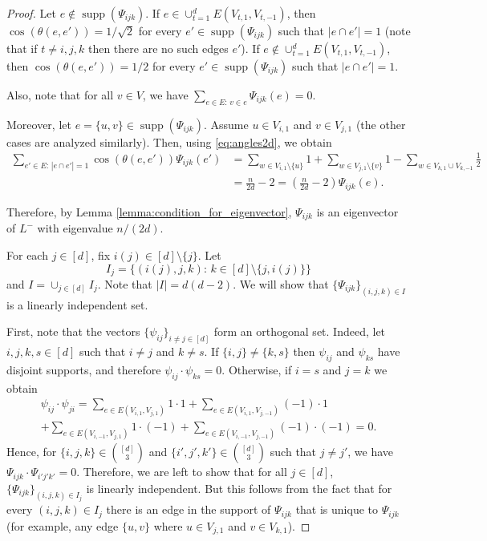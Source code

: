 \documentclass[a4paper,11pt]{article}
\theoremstyle{plain}
\theoremstyle{definition}
\DeclareMathOperator{\supp}{\text{supp}}
\begin{document}
\begin{proof}
Let $e\notin \supp(\Psi_{i j k})$. 
If $e\in \cup_{t=1}^d E(V_{t,1},V_{t,-1})$, then $\cos(\theta(e,e'))=1/\sqrt{2}$
for every $e'\in \supp(\Psi_{i j k})$ such that $|e\cap e'|=1$ (note that if $t\neq i,j,k$ then there are no such edges $e'$).
If $e\notin \cup_{t=1}^d E(V_{t,1},V_{t,-1})$, then $\cos(\theta(e,e'))=1/2$
for every $e'\in \supp(\Psi_{i j k})$ such that $|e\cap e'|=1$.

Also, note that for all $v\in V$, we have $\sum_{e\in E:\, v\in e} \Psi_{i j k}(e)=0$.

Moreover, let $e=\{u,v\}\in\supp(\Psi_{i j k})$. Assume $u\in V_{i, 1}$ and $v\in V_{j, 1}$ (the other cases are analyzed similarly). Then, using \eqref{eq:angles2d}, we obtain
\begin{align*}
        \sum_{e'\in E:\, |e\cap e'|=1} \cos(\theta(e,e'))\Psi_{ i j k}(e') &=\sum_{w\in V_{i,1}\setminus\{u\}} 1 + \sum_{w\in V_{j,1}\setminus\{v\}} 1
        - \sum_{w\in V_{k,1}\cup V_{k,-1}} \frac{1}{2}
      \\
      &= \frac{n}{2d}-2
      = \left(\frac{n}{2d}-2\right)\Psi_{i j k}(e).
\end{align*}


Therefore, by Lemma \ref{lemma:condition_for_eigenvector}, $\Psi_{i j k}$ is an eigenvector of $L^{-}$ with eigenvalue $n/(2d)$. 

For each $j\in [d]$, fix $i(j)\in[d]\setminus\{j\}$. Let
\[
    I_j=\{(i(j),j,k):\, k\in [d]\setminus\{j,i(j)\}\}
\]
and $I=\cup_{j\in[d]} I_j$. Note that $|I|=d(d-2)$. We will show that $\{\Psi_{ijk}\}_{(i,j,k)\in I}$ is a linearly independent set.

First, note that the vectors $\{\psi_{ij}\}_{i\neq j\in[d]}$ form an orthogonal set. Indeed, let $i,j,k,s\in[d]$ such that $i\neq j$ and $k\neq s$. If $\{i,j\}\neq \{k,s\}$ then $\psi_{i j}$ and $\psi_{k s}$ have disjoint supports, and therefore $\psi_{ij}\cdot \psi_{k s}=0$. Otherwise, if $i=s$ and $j=k$
we obtain
\begin{multline*}
\psi_{ij}\cdot \psi_{ji}
= \sum_{e\in E(V_{i,1},V_{j,1})} 1\cdot 1 + \sum_{e\in E(V_{i,1},V_{j,-1})} (-1)\cdot 1 \\ + \sum_{e\in E(V_{i,-1},V_{j,1})} 1\cdot (-1) + \sum_{e\in E(V_{i,-1},V_{j,-1})} (-1)\cdot(-1)=0.
\end{multline*}
Hence, for $\{i,j,k\}\in\binom{[d]}{3}$ and $\{i',j',k'\}\in\binom{[d]}{3}$ such that $j\neq j'$, we have $\Psi_{i j k}\cdot \Psi_{i' j' k'}=0$.
Therefore, we are left to show that for all $j\in[d]$, $\{\Psi_{i j k}\}_{(i,j,k)\in I_j}$ is linearly independent. But this follows from the fact that for every $(i,j,k)\in I_j$ there is an edge in the support of $\Psi_{i j k}$ that is unique to $\Psi_{i j k}$ (for example, any edge $\{u,v\}$ where $u\in V_{j,1}$ and $v\in V_{k,1}$).


\end{proof}
\end{document}

